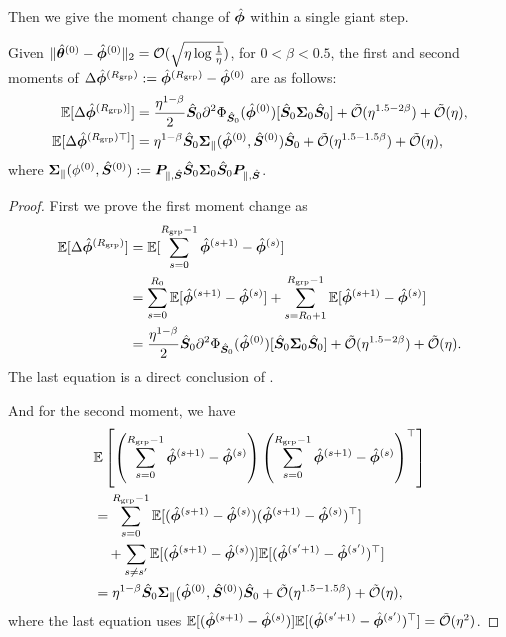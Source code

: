 Then we give the moment change of $\hat{{\bm{\phi}}}$ within a single giant step.
\begin{theorem}\label{thm;1st-2nd-moment-phi}
    Given $\|\hat{{\bm{\theta}}}^{(0)} - \hat{{\bm{\phi}}}^{(0)}\|_2=\mathcal{O}(\sqrt{\eta\log\frac{1}{\eta}})$, for $0<\beta<0.5$, the first and second moments of $\Delta \hat{{\bm{\phi}}}^{(R_{\mathrm{grp}})} :=\hat{{\bm{\phi}}}^{(R_{\mathrm{grp}})} -\hat{{\bm{\phi}}}^{(0)}$ are as follows:
    \begin{align*}
        \mathbb{E}[\Delta \hat{{\bm{\phi}}}^{(R_{\mathrm{grp}})]}] &= \frac{\eta^{1-\beta}}{2} \hat{{\bm{S}}}_0 \partial^2 \Phi_{\hat{{\bm{S}}}_0}(\hat{{\bm{\phi}}}^{(0)})[\hat{{\bm{S}}}_0{\bm{\Sigma}}_0\hat{{\bm{S}}}_0] + \tilde{\mathcal{O}}(\eta^{1.5-2\beta}) + \tilde{\mathcal{O}}(\eta),\\
        \mathbb{E}[\Delta \hat{{\bm{\phi}}}^{(R_{\mathrm{grp}})\top]}] &= \eta^{1-\beta}\hat{{\bm{S}}}_0{\bm{\Sigma}}_{\parallel}(\hat{{\bm{\phi}}}^{(0)},\hat{{\bm{S}}}^{(0)})\hat{{\bm{S}}}_0 + \tilde{\mathcal{O}}(\eta^{1.5-1.5\beta}) + \tilde{\mathcal{O}}(\eta),
    \end{align*}
    where ${\bm{\Sigma}}_{\parallel}(\phi^{(0)},\hat{{\bm{S}}}^{(0)}) := {\bm{P}}_{\parallel,\hat{{\bm{S}}}} \hat{{\bm{S}}}_0 {\bm{\Sigma}}_{0}\hat{{\bm{S}}}_0{\bm{P}}_{\parallel,\hat{{\bm{S}}}}$.
\end{theorem}
\begin{proof}
    First we prove the first moment change as
    \begin{align*}
        \mathbb{E}[\Delta \hat{{\bm{\phi}}}^{(R_{\mathrm{grp}})}] &= \mathbb{E}[\sum_{s=0}^{R_{\mathrm{grp}}-1} \hat{{\bm{\phi}}}^{(s+1)} - \hat{{\bm{\phi}}}^{(s)}] \\
        &= \sum_{s=0}^{R_0} \mathbb{E}[ \hat{{\bm{\phi}}}^{(s+1)} - \hat{{\bm{\phi}}}^{(s)}] + \sum_{s=R_0+1}^{R_{\mathrm{grp}}-1} \mathbb{E}[ \hat{{\bm{\phi}}}^{(s+1)} - \hat{{\bm{\phi}}}^{(s)}] \\
        &= \frac{\eta^{1-\beta}}{2} \hat{{\bm{S}}}_0 \partial^2 \Phi_{\hat{{\bm{S}}}_0}(\hat{{\bm{\phi}}}^{(0)})[\hat{{\bm{S}}}_0{\bm{\Sigma}}_0\hat{{\bm{S}}}_0] + \tilde{\mathcal{O}}(\eta^{1.5-2\beta}) + \tilde{\mathcal{O}}(\eta).
    \end{align*}
    The last equation is a direct conclusion of .

    And for the second moment, we have
    \begin{align*}
        &\mathbb{E}\left[\left(\sum_{s=0}^{R_{\mathrm{grp}}-1} \hat{{\bm{\phi}}}^{(s+1)} - \hat{{\bm{\phi}}}^{(s)}\right)\left(\sum_{s=0}^{R_{\mathrm{grp}}-1} \hat{{\bm{\phi}}}^{(s+1)} - \hat{{\bm{\phi}}}^{(s)}\right)^{\top}\right] \\
        &= \sum_{s=0}^{R_{\mathrm{grp}}-1} \mathbb{E}[(\hat{{\bm{\phi}}}^{(s+1)} - \hat{{\bm{\phi}}}^{(s)})(\hat{{\bm{\phi}}}^{(s+1)} - \hat{{\bm{\phi}}}^{(s)})^{\top}] \\
        &~~~+ \sum_{s\neq s'} \mathbb{E}[(\hat{{\bm{\phi}}}^{(s+1)} - \hat{{\bm{\phi}}}^{(s)})]\mathbb{E}[(\hat{{\bm{\phi}}}^{(s'+1)} - \hat{{\bm{\phi}}}^{(s')})^{\top}]\\
        &= \eta^{1-\beta}\hat{{\bm{S}}}_0{\bm{\Sigma}}_{\parallel}(\hat{{\bm{\phi}}}^{(0)},\hat{{\bm{S}}}^{(0)})\hat{{\bm{S}}}_0 + \tilde{\mathcal{O}}(\eta^{1.5-1.5\beta}) + \tilde{\mathcal{O}}(\eta),
    \end{align*}
    where the last equation uses $\mathbb{E}[(\hat{{\bm{\phi}}}^{(s+1)} - \hat{{\bm{\phi}}}^{(s)})]\mathbb{E}[(\hat{{\bm{\phi}}}^{(s'+1)} - \hat{{\bm{\phi}}}^{(s')})^{\top}] = \tilde{\mathcal{O}}(\eta^2)$.
\end{proof}
